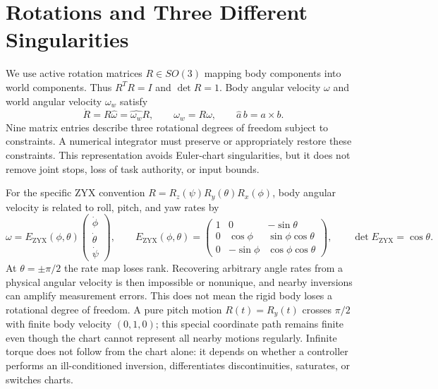 \section{Rotations and Three Different Singularities}

We use active rotation matrices $R\in SO(3)$ mapping body components into
world components. Thus $R^TR=I$ and $\det R=1$. Body angular velocity $\omega$
and world angular velocity $\omega_w$ satisfy
\begin{equation}\label{eq:manifold_rotation_kinematics}
 \dot R=R\widehat\omega=\widehat{\omega_w}R,\qquad
 \omega_w=R\omega,\qquad \widehat a\,b=a\times b.
\end{equation}
Nine matrix entries describe three rotational degrees of freedom subject to
constraints. A numerical integrator must preserve or appropriately restore
these constraints. This representation avoids Euler-chart singularities,
but it does not remove joint stops, loss of task authority, or input bounds.

For the specific ZYX convention $R=R_z(\psi)R_y(\theta)R_x(\phi)$, body
angular velocity is related to roll, pitch, and yaw rates by
\begin{equation}\label{eq:manifold_euler_rates}
 \omega=E_{\mathrm{ZYX}}(\phi,\theta)
 \begin{pmatrix}\dot\phi\\\dot\theta\\\dot\psi\end{pmatrix},
 \qquad
 E_{\mathrm{ZYX}}(\phi,\theta)=
 \begin{pmatrix}
 1&0&-\sin\theta\\
 0&\cos\phi&\sin\phi\cos\theta\\
 0&-\sin\phi&\cos\phi\cos\theta
 \end{pmatrix},
 \qquad \det E_{\mathrm{ZYX}}=\cos\theta.
\end{equation}
At $\theta=\pm\pi/2$ the rate map loses rank. Recovering arbitrary angle
rates from a physical angular velocity is then impossible or nonunique, and
nearby inversions can amplify measurement errors. This does not mean the
rigid body loses a rotational degree of freedom. A pure pitch motion
$R(t)=R_y(t)$ crosses $\pi/2$ with finite body velocity $(0,1,0)$; this special
coordinate path remains finite even though the chart cannot represent all
nearby motions regularly. Infinite torque does not follow from the chart
alone: it depends on whether a controller performs an ill-conditioned
inversion, differentiates discontinuities, saturates, or switches charts.

